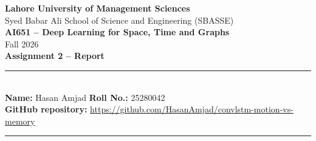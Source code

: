 \documentclass[11pt,a4paper]{article}
\begin{document}
\thispagestyle{empty}
\begin{center}
\textbf{Lahore University of Management Sciences}\\
Syed Babar Ali School of Science and Engineering (SBASSE)\\
\textbf{AI651 -- Deep Learning for Space, Time and Graphs}\\
Fall 2026\\[6pt]
\textbf{Assignment 2 -- Report}
\end{center}

\noindent\rule{\linewidth}{0.6pt}\\[2pt]
\textbf{Name:} Hasan Amjad \hfill \textbf{Roll No.:} 25280042\\[2pt]
\textbf{GitHub repository:} \url{https://github.com/HasanAmjad/convlstm-motion-vs-memory}\\[-4pt]
\noindent\rule{\linewidth}{0.6pt}



\clearpage


\clearpage
\appendix

\end{document}
